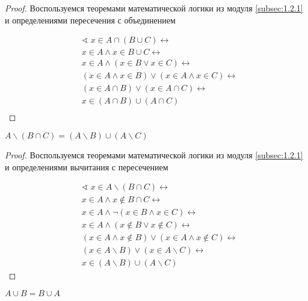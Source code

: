 \begin{proof}
    Воспользуемся теоремами математической логики из модуля \ref{subsec:1.2.1} и определениями пересечения с объединением

    \begin{align*}
        & \sphericalangle \; x \in A \cap (B \cup C) \leftrightarrow \\
        & x \in A \land x \in B \cup C \leftrightarrow \\
        & x \in A \land (x \in B \lor x \in C) \leftrightarrow \\
        & (x \in A \land x \in B) \lor (x \in A \land x \in C) \leftrightarrow \\
        & (x \in A \cap B) \lor (x \in A \cap C) \leftrightarrow \\
        & x \in (A \cap B) \cup  (A \cap C) \\
    \end{align*}
\end{proof}

\newpage

\begin{theorem}
    $A \backslash (B \cap C) = (A \backslash B) \cup (A \backslash C)$
\end{theorem}

\begin{proof}
    Воспользуемся теоремами математической логики из модуля \ref{subsec:1.2.1} и определениями вычитания с пересечением

    \begin{align*}
        & \sphericalangle \; x \in A \backslash (B \cap C) \leftrightarrow \\
        & x \in A \land x \notin B \cap C \leftrightarrow \\
        & x \in A \land \neg (x \in B \land x \in C) \leftrightarrow \\
        & x \in A \land (x \notin B \lor x \notin C) \leftrightarrow \\
        & (x \in A \land x \notin B) \lor (x \in A \land x \notin C) \leftrightarrow \\
        & (x \in A \backslash B) \lor (x \in A \backslash C) \leftrightarrow \\
        & x \in (A \backslash B) \cup (A \backslash C)
    \end{align*}
\end{proof}

\begin{theorem}
    $A \cup B = B \cup A$
\end{theorem}

